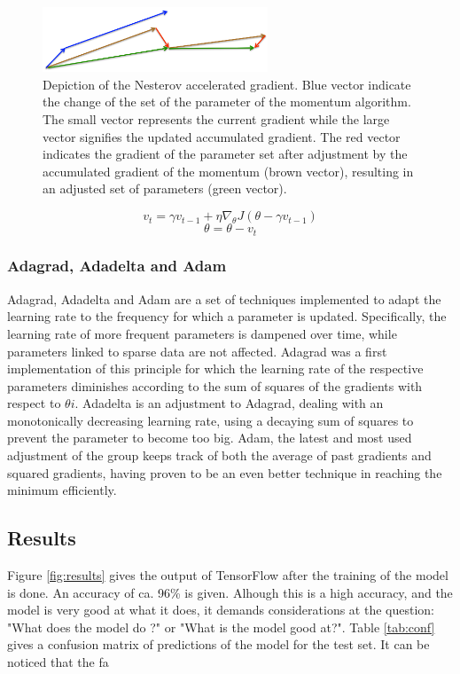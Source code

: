 \begin{figure}[h!]
	\centering
	\includegraphics[width=0.6\textwidth]{../figures/nag}
	\caption{Depiction of the Nesterov accelerated gradient. Blue vector indicate the change of the set of the parameter of the momentum algorithm. The small vector represents the current gradient while the large vector signifies the updated accumulated gradient. The red vector indicates the gradient of the parameter set after adjustment by the accumulated gradient of the momentum (brown vector), resulting in an adjusted set of parameters (green vector).
		\label{fig:nag}}
\end{figure}

$$v_t = \gamma v_{t-1} + \eta \nabla_\theta J( \theta - \gamma v_{t-1})$$
$$ \theta = \theta - v_t $$

\subsubsection{Adagrad, Adadelta and Adam \label{subsubsec:aaa}}
Adagrad, Adadelta and Adam are a set of techniques implemented to adapt the learning rate to the frequency for which a parameter is updated. Specifically, the learning rate of more frequent parameters is dampened over time, while parameters linked to sparse data are not affected. Adagrad was a first implementation of this principle for which the learning rate of the respective parameters diminishes according to the sum of squares of the gradients with respect to $\theta{i}$. Adadelta is an adjustment to  Adagrad, dealing with an monotonically decreasing learning rate, using a decaying sum of squares to prevent the parameter to become too big. Adam, the latest and most used adjustment of the group keeps track of both the average of past gradients and squared gradients, having proven to be an even better technique in reaching the minimum efficiently.

\subsection{Results}

Figure \ref{fig:results} gives the output of TensorFlow after the training of the model is done. An accuracy of ca. 96\% is given. Alhough this is a high accuracy, and the model is very good at what it does, it demands considerations at the question: "What does the model do ?" or "What is the model good at?". Table \ref{tab:conf} gives a confusion matrix of predictions of the model for the test set. It can be noticed that the fa


